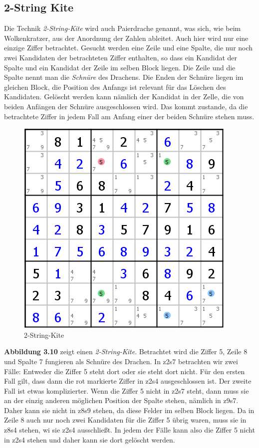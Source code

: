 \documentclass[accentcolor=tud6b,11pt,paper=a4]{tudreport}
\begin{document}
\newpage
\subsection{2-String Kite}
Die Technik \textit{2-String-Kite} wird auch Paierdrache genannt, was sich, wie beim Wolkenkratzer, aus der Anordnung der Zahlen ableitet. Auch hier wird nur eine einzige Ziffer betrachtet. Gesucht werden eine Zeile und eine Spalte, die nur noch zwei Kandidaten der betrachteten Ziffer enthalten, so dass ein Kandidat der Spalte und ein Kandidat der Zeile im selben Block liegen. Die Zeile und die Spalte nennt man die \textit{Schnüre} des Drachens. Die Enden der Schnüre liegen im gleichen Block, die Position des Anfangs ist relevant für das Löschen des Kandidaten. Gelöscht werden kann nämlich der Kandidat in der Zelle, die von beiden Anfängen der Schnüre ausgeschlossen wird. Das kommt zustande, da die betrachtete Ziffer in jedem Fall am Anfang einer der beiden Schnüre stehen muss.

\begin{figure}[h]
\begin{center}
\includegraphics{./img/2stringkite.png}
\caption{2-String-Kite}
\end{center}
\end{figure}

\textbf{Abbildung 3.10} zeigt einen \textit{2-String-Kite}. Betrachtet wird die Ziffer 5, Zeile 8 und Spalte 7 fungieren als Schnüre des Drachen. In z2s7 betrachten wir zwei Fälle: Entweder die Ziffer 5 steht dort oder sie steht dort nicht. Für den ersten Fall gilt, dass dann die rot markierte Ziffer in z2s4 ausgeschlossen ist. Der zweite Fall ist etwas komplizierter. Wenn die Ziffer 5 nicht in z2s7 steht, dann muss sie an der einzig anderen möglichen Position der Spalte stehen, nämlich in z9s7. Daher kann sie nicht in z8s9 stehen, da diese Felder im selben Block liegen. Da in Zeile 8 auch nur noch zwei Kandidaten für die Ziffer 5 übrig waren, muss sie in z8s4 stehen, wi sie z2s4 ausschließt. In jedem der Fälle kann also die Ziffer 5 nicht in z2s4 stehen und daher kann sie dort gelöscht werden.
\end{document}
